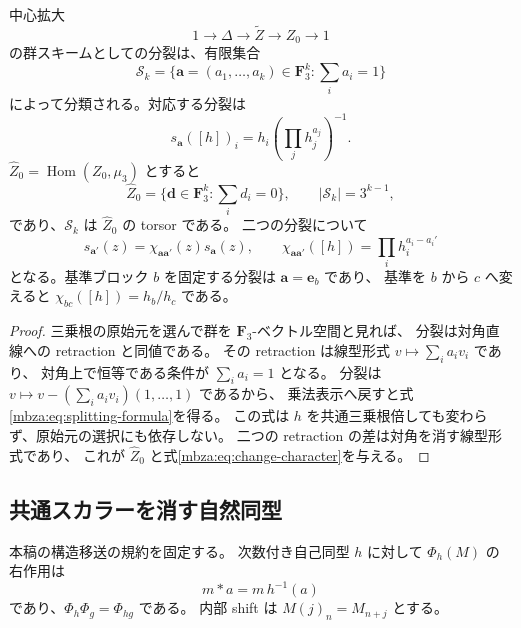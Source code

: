 \begin{proposition}
\label{mbza:prop:splittings}
中心拡大
\begin{equation}\label{mbza:eq:central-extension}
 1\longrightarrow\Delta\longrightarrow\widetilde Z
   \longrightarrow Z_0\longrightarrow1
\end{equation}
の群スキームとしての分裂は、有限集合
\begin{equation}\label{mbza:eq:splitting-space}
 \mathscr S_k=
 \{\boldsymbol a=(a_1,\ldots,a_k)\in\mathbf F_3^k:
                   \textstyle\sum_i a_i=1\}
\end{equation}
によって分類される。対応する分裂は
\begin{equation}\label{mbza:eq:splitting-formula}
 s_{\boldsymbol a}([h])_i
   =h_i\left(\prod_jh_j^{a_j}\right)^{-1}.
\end{equation}
$\widehat Z_0=\operatorname{Hom}(Z_0,\mu_3)$ とすると
\[
 \widehat Z_0=\{\boldsymbol d\in\mathbf F_3^k:\textstyle\sum_i d_i=0\},
 \qquad |\mathscr S_k|=3^{k-1},
\]
であり、$\mathscr S_k$ は $\widehat Z_0$ の torsor である。
二つの分裂について
\begin{equation}\label{mbza:eq:change-character}
 s_{\boldsymbol a'}(z)
   =\chi_{\boldsymbol a\boldsymbol a'}(z)s_{\boldsymbol a}(z),
 \qquad
 \chi_{\boldsymbol a\boldsymbol a'}([h])
      =\prod_i h_i^{a_i-a_i'}
\end{equation}
となる。基準ブロック $b$ を固定する分裂は $\boldsymbol a=\boldsymbol e_b$ であり、
基準を $b$ から $c$ へ変えると $\chi_{bc}([h])=h_b/h_c$ である。
\end{proposition}
\begin{proof}
三乗根の原始元を選んで群を $\mathbf F_3$-ベクトル空間と見れば、
分裂は対角直線への retraction と同値である。
その retraction は線型形式 $v\mapsto\sum_i a_iv_i$ であり、
対角上で恒等である条件が $\sum_i a_i=1$ となる。
分裂は $v\mapsto v-(\sum_i a_iv_i)(1,\ldots,1)$ であるから、
乗法表示へ戻すと式\eqref{mbza:eq:splitting-formula}を得る。
この式は $h$ を共通三乗根倍しても変わらず、原始元の選択にも依存しない。
二つの retraction の差は対角を消す線型形式であり、
これが $\widehat Z_0$ と式\eqref{mbza:eq:change-character}を与える。
\end{proof}

\subsection{共通スカラーを消す自然同型}

本稿の構造移送の規約を固定する。
次数付き自己同型 $h$ に対して $\Phi_h(M)$ の右作用は
\begin{equation}\label{mbza:eq:transport}
 m*a=m\,h^{-1}(a)
\end{equation}
であり、$\Phi_h\Phi_g=\Phi_{hg}$ である。
内部 shift は $M(j)_n=M_{n+j}$ とする。

